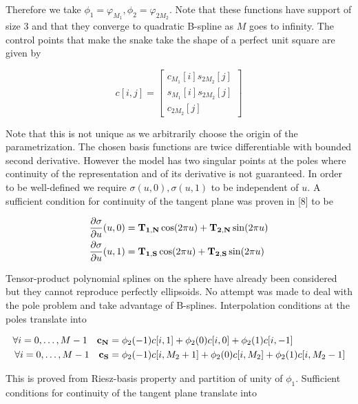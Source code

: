 \documentclass[a4paper, 11pt]{article}
\begin{document}
Therefore we take $\phi_1 = \varphi_{M_1}, \phi_2 = \varphi_{2M_2}$. Note that these functions have support of size 3 
and that they converge to quadratic B-spline as $M$ goes to infinity. The control points that make the snake take the 
shape of a perfect unit square are given by

\begin{equation}
  c[i, j]  = \begin{bmatrix} c_{M_1}[i]s_{2M_2}[j] \\ s_{M_1}[i]s_{2M_2}[j] \\ c_{2M_2}[j] \end{bmatrix}
\end{equation}

Note that this is not unique as we arbitrarily choose the origin of the parametrization. The chosen basis functions are 
twice differentiable with bounded second derivative. However the model has two singular points at the poles where 
continuity of the representation and of its derivative is not guaranteed. In order to be well-defined we require 
$\sigma(u, 0), \sigma(u, 1)$ to be independent of $u$. A sufficient condition for continuity of the tangent plane was 
proven in [8] to be 

\begin{align}
  \frac{\partial \sigma}{\partial u}(u, 0) &= {\bf T_{1, N}} \cos (2\pi u) + {\bf T_{2, N}} \sin (2\pi u) \\
  \frac{\partial \sigma}{\partial u}(u, 1) &= {\bf T_{1, S}} \cos (2\pi u) + {\bf T_{2, S}} \sin (2\pi u) \\
\end{align}

Tensor-product polynomial splines on the sphere have already been considered but they cannot reproduce perfectly 
ellipsoids. No attempt was made to deal with the pole problem and take advantage of B-splines. Interpolation conditions 
at the poles translate into 

\begin{align*}
  \forall i=0, \ldots, M-1 \quad {\bf c_N} &= \phi_2(-1) c[i, 1] + \phi_2(0) c[i, 0] + \phi_2(1) c[i, -1] \\
  \forall i=0, \ldots, M-1 \quad {\bf c_S} &= \phi_2(-1) c[i, M_2+1] + \phi_2(0) c[i, M_2] + \phi_2(1) c[i, M_2-1]
\end{align*}

This is proved from Riesz-basis property and partition of unity of $\phi_1$. Sufficient conditions for continuity of the 
tangent plane translate into
\end{document}
